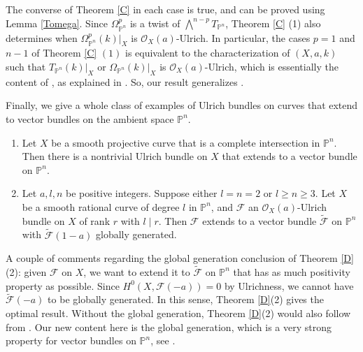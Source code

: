 \documentclass[11pt,letterpaper]{amsart}
\newenvironment{manualtheorem}[1]{%
  \renewcommand\themanualtheoreminner{#1}%
  \manualtheoreminner
}{\endmanualtheoreminner}
\begin{document}
The converse of Theorem \ref{C} in each case is true, and can be proved using Lemma \ref{Tomega}. Since $\Omega^p_{\mathbb{P}^n}$ is a twist of $\bigwedge^{n-p} T_{\mathbb{P}^n}$, Theorem \ref{C} (1) also determines when $\Omega^p_{\mathbb{P}^n}(k)|_X$ is $\mathcal{O}_X(a)$-Ulrich. In particular, the cases $p=1$ and $n-1$ of Theorem \ref{C} $(1)$ is equivalent to the characterization of $(X,a,k)$ such that $T_{\mathbb{P}^n}(k)|_X$ or $\Omega_{\mathbb{P}^n}(k)|_X$ is $\mathcal{O}_X(a)$-Ulrich, which is essentially the content of \cite[Theorem 1.2]{lopez2026ulrichness}, as explained in \cite[\S 2]{lopez2026ulrichness}. So, our result generalizes \cite{lopez2026ulrichness}.

Finally, we give a whole class of examples of Ulrich bundles on curves that extend to vector bundles on the ambient space $\mathbb{P}^n.$

\begin{manualtheorem}{D}\label{D}
 \begin{enumerate}
     \item Let $X$ be a smooth projective curve that is a complete intersection in $\mathbb{P}^n$. Then there is a nontrivial Ulrich bundle on $X$ that extends to a vector bundle on $\mathbb{P}^n$.
     \item
   Let $a,l,n$ be positive integers. Suppose either
$l=n=2$ or $l\ge n\ge 3$. Let $X$ be a smooth rational
curve of degree $l$ in $\mathbb{P}^n$, and $\mathcal{F}$ an
$\mathcal{O}_X(a)$-Ulrich bundle on $X$ of rank $r$ with
$l\mid r$. Then $\mathcal{F}$ extends to a vector bundle $\widetilde{\mathcal{F}}$ on
$\mathbb{P}^n$ with $\widetilde{\mathcal{F}}(1-a)$ globally generated.  
\end{enumerate} 
\end{manualtheorem}
A couple of comments regarding the global generation conclusion of Theorem \ref{D}(2): given $\mathcal{F}$ on $X$, we want to extend it to $\widetilde{\mathcal{F}}$ on $\mathbb{P}^n$ that has as much positivity property as possible. Since $H^0(X,\mathcal{F}(-a))=0$ by Ulrichness, we cannot have $\widetilde{\mathcal{F}}(-a)$ to be globally generated. In this sense, Theorem \ref{D}(2) gives the optimal result.  Without the global generation, Theorem \ref{D}(2) would also follow from \cite{mathur2020extending}. Our new content here is the global generation, which is a very strong property for vector bundles on $\mathbb{P}^n$, see \cite{anghel2018globally}. 
\end{document}
